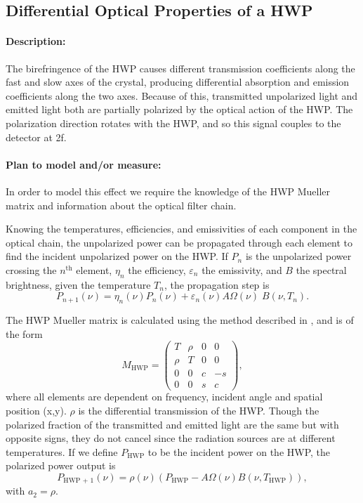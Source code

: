 
\subsection{Differential Optical Properties of a HWP}
\label{HWP Differential Optical Properties}

\paragraph{Description:}
The birefringence of the HWP causes different transmission coefficients along the fast and slow axes of the crystal,
producing differential absorption and emission coefficients along the two axes.
Because of this, transmitted unpolarized light and emitted light both are partially polarized by the optical action of the HWP.
The polarization direction rotates with the HWP, and so this signal couples to the detector at 2f.

\paragraph{Plan to model and/or measure:}
In order to model this effect we require the knowledge of the HWP Mueller matrix and information about the optical filter chain.

Knowing the temperatures, efficiencies, and emissivities of each component in the optical chain,
the unpolarized power can be propagated through each element to find the incident unpolarized power on the HWP.
If $P_n$ is the unpolarized power crossing the $n^\text{th}$ element, $\eta_n$ the efficiency, $\varepsilon_n$ the emissivity, and $B$ the spectral brightness, given the temperature $T_n$,
the propagation step is 
\begin{equation}
\label{unpolarized_propagation}
P_{n+1}(\nu) = \eta_n(\nu) P_n(\nu) + \varepsilon_n(\nu) A\Omega(\nu)\;  B(\nu, T_n) .
\end{equation}


The HWP Mueller matrix is calculated using the method described in \cite{Salatino16}, and is of the form
\[
M_\text{HWP} = \left(
\begin{array}{cccc}
T & \rho & 0 & 0\\
\rho & T & 0 & 0\\
0 & 0 & c & -s \\
0 & 0 & s & c
\end{array}
\right),
\]
where all elements are dependent on frequency, incident angle and spatial position (x,y).
$\rho$ is the differential transmission of the HWP.
Though the polarized fraction of the transmitted and emitted light are the same but with opposite signs,
they do not cancel since the radiation sources are at different temperatures.
If we define $P_\text{HWP}$ to be the incident power on the HWP, the polarized power output is 
\begin{equation}
\label{eq:polarized_output}
P_\text{HWP + 1}(\nu) = \rho(\nu)(P_\text{HWP} - A\Omega(\nu)B(\nu, T_\text{HWP})),
\end{equation}
with $a_2 = \rho$. 

